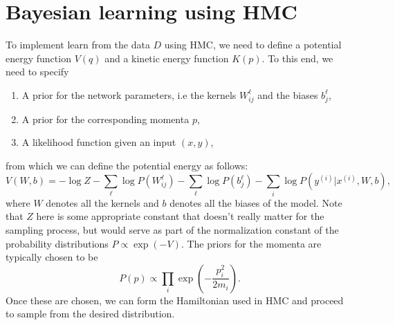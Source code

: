 \section{Bayesian learning using HMC}
To implement learn from the data $D$ using HMC, we need to define a potential energy function $V(q)$ 
and a kinetic energy function $K(p)$. To this end, we need to specify
\begin{enumerate}
  \item A prior for the network parameters, i.e the kernels $W_{ij}^\ell$ and the biases $b_j^{\ell}$,
  \item A prior for the corresponding momenta $p$,
  \item A likelihood function given an input $(x, y)$,
\end{enumerate}
from which we can define the potential energy as follows:
\begin{equation}
  V(W, b) = - \log Z - \sum_{\ell}\log P(W_{ij}^\ell) - \sum_{\ell}\log P(b_j^\ell) - \sum_i \log P(y^{(i)}| x^{(i)}, W, b), 
\end{equation}
where $W$ denotes all the kernels and $b$ denotes all the biases of the model. Note that $Z$ here is some appropriate constant that doesn't really matter for the sampling process, but would serve as part of the normalization constant of the probability distributions $P \propto \exp(-V)$.
The priors for the momenta are typically chosen to be 
\begin{equation}
  P(p) \propto \prod_i \exp \left(- \frac{p_i^2}{2m_i}\right).
\end{equation}
Once these are chosen, we can form the Hamiltonian used in HMC and proceed to sample from the desired distribution.
